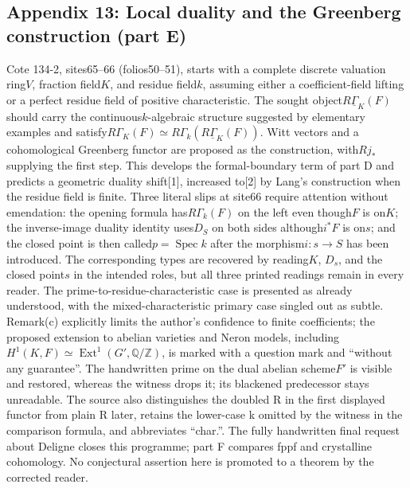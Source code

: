 \subsection*{Appendix 13: Local duality and the Greenberg construction (part E)}
Cote 134-2, sites65--66 (folios50--51), starts with a complete discrete valuation ring$V$, fraction field$K$, and residue field$k$, assuming either a coefficient-field lifting or a perfect residue field of positive characteristic. The sought object$R\underline\Gamma_K(F)$ should carry the continuous$k$-algebraic structure suggested by elementary examples and satisfy$R\Gamma_K(F)\simeq R\Gamma_k(R\underline\Gamma_K(F))$. Witt vectors and a cohomological Greenberg functor are proposed as the construction, with$Rj_*$ supplying the first step. This develops the formal-boundary term of part D and predicts a geometric duality shift[1], increased to[2] by Lang's construction when the residue field is finite. Three literal slips at site66 require attention without emendation: the opening formula has$R\Gamma_k(F)$ on the left even though$F$ is on$K$; the inverse-image duality identity uses$D_S$ on both sides although$i^*F$ is on$s$; and the closed point is then called$p=\operatorname{Spec}k$ after the morphism$i:s\to S$ has been introduced. The corresponding types are recovered by reading$K$, $D_s$, and the closed point$s$ in the intended roles, but all three printed readings remain in every reader. The prime-to-residue-characteristic case is presented as already understood, with the mixed-characteristic primary case singled out as subtle. Remark(c) explicitly limits the author's confidence to finite coefficients; the proposed extension to abelian varieties and Neron models, including$H^1(K,F)\simeq\operatorname{Ext}^1(G',\mathbb Q/\mathbb Z)$, is marked with a question mark and ``without any guarantee''. The handwritten prime on the dual abelian scheme$F'$ is visible and restored, whereas the witness drops it; its blackened predecessor stays unreadable. The source also distinguishes the doubled R in the first displayed functor from plain R later, retains the lower-case k omitted by the witness in the comparison formula, and abbreviates ``char.''. The fully handwritten final request about Deligne closes this programme; part F compares fppf and crystalline cohomology. No conjectural assertion here is promoted to a theorem by the corrected reader.

